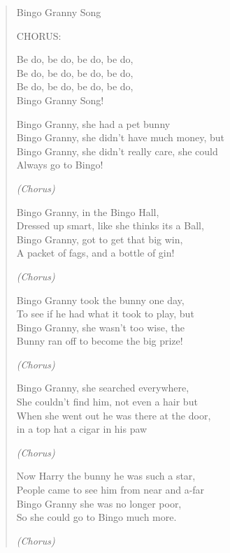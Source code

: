 \begin{verse}
\begin{centering}
Bingo Granny Song

CHORUS:

Be do, be do, be do, be do, \\
Be do, be do, be do, be do, \\
Be do, be do, be do, be do, \\
Bingo Granny Song!

Bingo    Granny,   she   had     a    pet    bunny  \\
Bingo    Granny,   she   didn't have   much    money,   but \\
Bingo    Granny,   she   didn't  really     care,       she could \\
Always go to  Bingo! 

\emph{(Chorus)}

Bingo    Granny,     in      the Bingo      Hall, \\
Dressed up smart, like   she  thinks   its    a      Ball, \\
Bingo    Granny,    got    to    get        that  big   win, \\
A  packet of fags,  and   a     bottle of gin!


\emph{(Chorus)}

Bingo Granny took the bunny one day, \\
To see if he had what it took to play, but \\
Bingo Granny, she wasn't too wise, the \\
Bunny ran off to become the big prize!

\emph{(Chorus)}

Bingo Granny, she searched everywhere, \\
She couldn't find him, not even a hair but \\
When she went out he was there at the door, \\
in a top hat a cigar in his paw

\emph{(Chorus)}

Now Harry the bunny he was such a star, \\
People came to see him from near and a-far \\
Bingo Granny she was no longer poor, \\
So she could go to Bingo much more.

\emph{(Chorus)}

\end{centering}
\end{verse}

